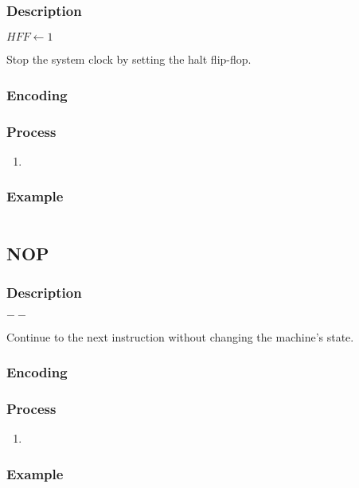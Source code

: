     \subsubsection{Description}
    $HFF \leftarrow 1$
    \par Stop the system clock by setting the halt flip-flop.
    \subsubsection{Encoding}
    \subsubsection{Process}
    \begin{enumerate}
        \item
    \end{enumerate}

    \subsubsection{Example}
    \begin{verbatim}
    \end{verbatim}

\subsection{NOP}\label{subsec:nop}
    \subsubsection{Description}
    $ -- $
    \par Continue to the next instruction without changing the machine's state.
    \subsubsection{Encoding}
    \subsubsection{Process}
    \begin{enumerate}
        \item
    \end{enumerate}

    \subsubsection{Example}
    \begin{verbatim}
    \end{verbatim}